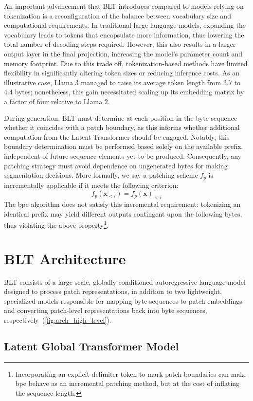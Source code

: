 An important advancement that {\textsc BLT} introduces compared to models relying on tokenization is a reconfiguration of the balance between vocabulary size and computational requirements. In traditional large language models, expanding the vocabulary leads to tokens that encapsulate more information, thus lowering the total number of decoding steps required. However, this also results in a larger output layer in the final projection, increasing the model’s parameter count and memory footprint. Due to this trade off, tokenization-based methods have limited flexibility in significantly altering token sizes or reducing inference costs. As an illustrative case, Llama 3 managed to raise its average token length from 3.7 to 4.4 bytes; nonetheless, this gain necessitated scaling up its embedding matrix by a factor of four relative to Llama 2.

During generation, {\textsc BLT} must determine at each position in the byte sequence whether it coincides with a patch boundary, as this informs whether additional computation from the Latent Transformer should be engaged. Notably, this boundary determination must be performed based solely on the available prefix, independent of future sequence elements yet to be produced. Consequently, any patching strategy must avoid dependence on ungenerated bytes for making segmentation decisions. More formally, we say a patching scheme $f_p$ is incrementally applicable if it meets the following criterion:
$$f_p(\pmb{x}_{<i}) = f_p(\pmb{x})_{<i}$$
The bpe algorithm does not satisfy this incremental requirement: tokenizing an identical prefix may yield different outputs contingent upon the following bytes, thus violating the above property\footnote{Incorporating an explicit delimiter token to mark patch boundaries can make bpe behave as an incremental patching method, but at the cost of inflating the sequence length.}.

\section{{\textsc BLT} Architecture}
\label{section:architecture}
{\textsc BLT} consists of a large-scale, globally conditioned autoregressive language model designed to process patch representations, in addition to two lightweight, specialized models responsible for mapping byte sequences to patch embeddings and converting patch-level representations back into byte sequences, respectively~(\autoref{fig:arch_high_level}).

\subsection{Latent Global Transformer Model}

